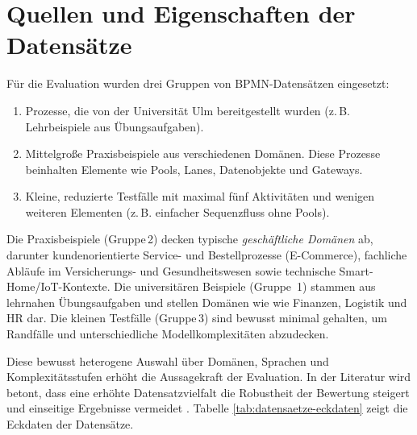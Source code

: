 \section{Quellen und Eigenschaften der Datensätze}\label{sec:quellen-und-eigenschaften-der-datensatze}

Für die Evaluation wurden drei Gruppen von \ac{BPMN}-Datensätzen eingesetzt:

\begin{enumerate}
    \item Prozesse, die von der Universität Ulm bereitgestellt wurden (z.\,B. Lehrbeispiele aus Übungsaufgaben).
    \item Mittelgroße Praxisbeispiele aus verschiedenen Domänen. Diese Prozesse beinhalten Elemente wie Pools, Lanes, Datenobjekte und Gateways.
    \item Kleine, reduzierte Testfälle mit maximal fünf Aktivitäten und wenigen weiteren Elementen (z.\,B. einfacher Sequenzfluss ohne Pools).
\end{enumerate}

Die Praxisbeispiele (Gruppe\,2) decken typische \emph{geschäftliche Domänen} ab, darunter kundenorientierte Service- und Bestellprozesse (E-Commerce), fachliche Abläufe im Versicherungs- und Gesundheitswesen sowie technische Smart-Home/IoT-Kontexte. Die universitären Beispiele (Gruppe~1) stammen aus lehrnahen Übungsaufgaben und stellen Domänen wie wie Finanzen, Logistik und HR dar. Die kleinen Testfälle (Gruppe\,3) sind bewusst minimal gehalten, um Randfälle und unterschiedliche Modellkomplexitäten abzudecken.

Diese bewusst heterogene Auswahl über Domänen, Sprachen und Komplexitätsstufen erhöht die Aussagekraft der Evaluation. In der Literatur wird betont, dass eine erhöhte Datensatzvielfalt die Robustheit der Bewertung steigert und einseitige Ergebnisse vermeidet \cite{blake2025datasetdiversity}. Tabelle \ref{tab:datensaetze-eckdaten} zeigt die Eckdaten der Datensätze.

